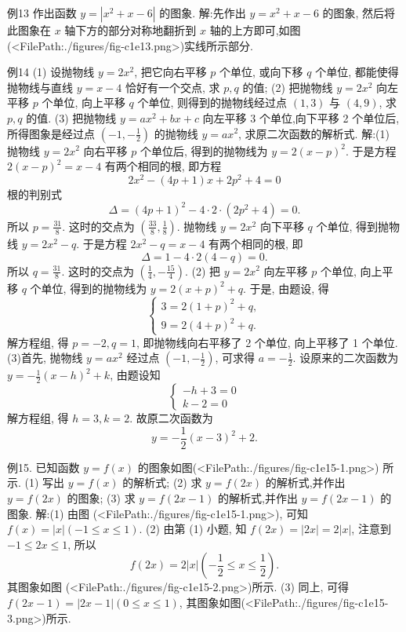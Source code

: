 例13 作出函数 $y=\left|x^2+x-6\right|$ 的图象.
解:先作出 $y=x^2+x-6$ 的图象, 然后将此图象在 $x$ 轴下方的部分对称地翻折到 $x$ 轴的上方即可,如图(<FilePath:./figures/fig-c1e13.png>)实线所示部分.



例14 (1) 设抛物线 $y=2 x^2$, 把它向右平移 $p$ 个单位, 或向下移 $q$ 个单位, 都能使得抛物线与直线 $y=x-4$ 恰好有一个交点, 求 $p, q$ 的值;
(2) 把抛物线 $y=2 x^2$ 向左平移 $p$ 个单位, 向上平移 $q$ 个单位, 则得到的抛物线经过点 $(1,3)$ 与 $(4,9)$, 求 $p, q$ 的值.
(3) 把抛物线 $y=a x^2+b x+c$ 向左平移 3 个单位,向下平移 2 个单位后, 所得图象是经过点 $\left(-1,-\frac{1}{2}\right)$ 的抛物线 $y=a x^2$, 求原二次函数的解析式.
解:(1) 抛物线 $y=2 x^2$ 向右平移 $p$ 个单位后, 得到的抛物线为 $y= 2(x-p)^2$. 于是方程 $2(x-p)^2=x-4$ 有两个相同的根, 即方程
$$
2 x^2-(4 p+1) x+2 p^2+4=0
$$
根的判别式
$$
\Delta=(4 p+1)^2-4 \cdot 2 \cdot\left(2 p^2+4\right)=0 .
$$
所以 $p=\frac{31}{8}$. 这时的交点为 $\left(\frac{33}{8}, \frac{1}{8}\right)$.
抛物线 $y=2 x^2$ 向下平移 $q$ 个单位, 得到抛物线 $y=2 x^2-q$. 于是方程 $2 x^2-q=x-4$ 有两个相同的根, 即
$$
\Delta=1-4 \cdot 2(4-q)=0 .
$$
所以 $q=\frac{31}{8}$. 这时的交点为 $\left(\frac{1}{4},-\frac{15}{4}\right)$.
(2) 把 $y=2 x^2$ 向左平移 $p$ 个单位, 向上平移 $q$ 个单位, 得到的抛物线为 $y=2(x+p)^2+q$. 于是, 由题设, 得
$$
\left\{\begin{array}{l}
3=2(1+p)^2+q, \\
9=2(4+p)^2+q .
\end{array}\right.
$$
解方程组, 得 $p=-2, q=1$, 即抛物线向右平移了 2 个单位, 向上平移了 1 个单位.
(3)首先, 抛物线 $y=a x^2$ 经过点 $\left(-1,-\frac{1}{2}\right)$, 可求得 $a=-\frac{1}{2}$.
设原来的二次函数为 $y=-\frac{1}{2}(x-h)^2+k$, 由题设知
$$
\left\{\begin{array}{l}
-h+3=0 \\
k-2=0
\end{array}\right.
$$
解方程组, 得 $h=3, k=2$. 故原二次函数为
$$
y=-\frac{1}{2}(x-3)^2+2 .
$$



例15. 已知函数 $y=f(x)$ 的图象如图(<FilePath:./figures/fig-c1e15-1.png>) 所示.
(1) 写出 $y=f(x)$ 的解析式;
(2) 求 $y=f(2 x)$ 的解析式,并作出 $y=f(2 x)$ 的图象;
(3) 求 $y=f(2 x-1)$ 的解析式,并作出 $y=f(2 x-1)$ 的图象.
解:(1) 由图 (<FilePath:./figures/fig-c1e15-1.png>), 可知 $f(x)=|x|(-1 \leqslant x \leqslant 1)$.
(2) 由第 (1) 小题, 知 $f(2 x)=|2 x|=2|x|$, 注意到 $-1 \leqslant 2 x \leqslant 1$, 所以
$$
f(2 x)=2|x|\left(-\frac{1}{2} \leqslant x \leqslant \frac{1}{2}\right) .
$$
其图象如图 (<FilePath:./figures/fig-c1e15-2.png>)所示.
(3) 同上, 可得 $f(2 x-1)=|2 x-1|(0 \leqslant x \leqslant 1)$, 其图象如图(<FilePath:./figures/fig-c1e15-3.png>)所示.



